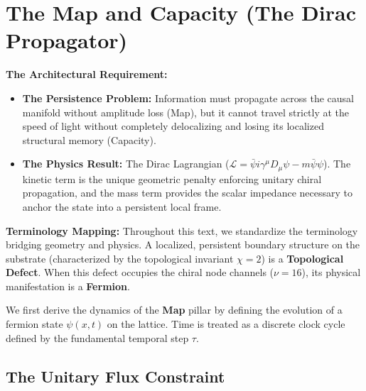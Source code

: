 \section{The Map and Capacity (The Dirac Propagator)}
\label{sec:map_capacity}

\textbf{The Architectural Requirement:}
\begin{itemize}
    \item \textbf{The Persistence Problem:} Information must propagate across the causal manifold without amplitude loss (Map), but it cannot travel strictly at the speed of light without completely delocalizing and losing its localized structural memory (Capacity).
    \item \textbf{The Physics Result:} The Dirac Lagrangian ($\mathcal{L} = \bar{\psi}i\gamma^\mu D_\mu\psi - m\bar{\psi}\psi$). The kinetic term is the unique geometric penalty enforcing unitary chiral propagation, and the mass term provides the scalar impedance necessary to anchor the state into a persistent local frame.
\end{itemize}

\textbf{Terminology Mapping:} Throughout this text, we standardize the terminology bridging geometry and physics. A localized, persistent boundary structure on the substrate (characterized by the topological invariant $\chi=2$) is a \textbf{Topological Defect}. When this defect occupies the chiral node channels ($\nu=16$), its physical manifestation is a \textbf{Fermion}. 

We first derive the dynamics of the \textbf{Map} pillar by defining the evolution of a fermion state $\psi(x,t)$ on the lattice. Time is treated as a discrete clock cycle defined by the fundamental temporal step $\tau$.

\subsection{The Unitary Flux Constraint}
\label{sec:unitary_flux_constraint}

